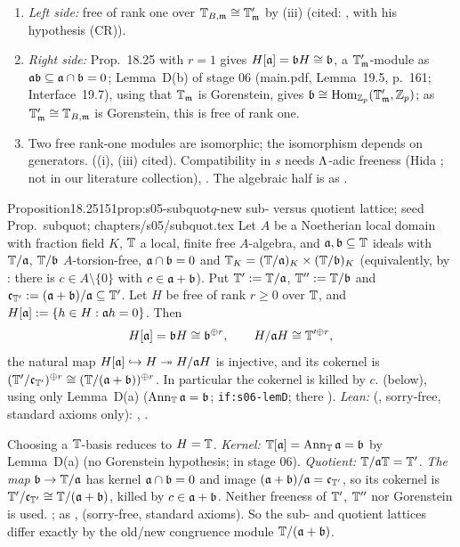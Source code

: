\begin{outline}
\begin{enumerate}[label=(\arabic*)]
\item \emph{Left side:} free of rank one over $\mathbb{T}_{B,\mathfrak{m}}\cong\mathbb{T}'_{\mathfrak{m}}$ by (iii) (cited: \cite[Thm.~4.5]{Hs}, with his hypothesis (CR)).
\item \emph{Right side:} Prop.~18.25 with $r=1$ gives $H[\mathfrak{a}]=\mathfrak{b} H\cong\mathfrak{b}$, a $\mathbb{T}'_{\mathfrak{m}}$-module as $\mathfrak{a}\mathfrak{b}\subseteq\mathfrak{a}\cap\mathfrak{b}=0$; Lemma~D(b) of stage 06
  (main.pdf, Lemma~19.5, p.~161; Interface~19.7), using that $\mathbb{T}_{\mathfrak{m}}$ is Gorenstein, gives $\mathfrak{b}\cong\operatorname{Hom}_{\mathbb{Z}_p}(\mathbb{T}'_{\mathfrak{m}},\mathbb{Z}_p)$; as $\mathbb{T}'_{\mathfrak{m}}\cong\mathbb{T}_{B,\mathfrak{m}}$ is
  Gorenstein, this is free of rank one.
\item Two free rank-one modules are isomorphic; the isomorphism depends on generators. \stpmc{} ((i), (iii) cited). Compatibility in
  $s$ needs $\Lambda$-adic freeness (Hida \cite{Hi86a}; not in our literature collection), \stsketch. The algebraic half is
  \stformal{} as .
\end{enumerate}
\end{outline}
\begin{quoted}{Proposition}{18.25}{151}{prop:s05-subquot}{$q$-new sub- versus quotient lattice; seed Prop.~subquot; }{chapters/s05/subquot.tex}\label{rpt:prop:s05-subquot}
Let $A$ be a Noetherian local domain with fraction field $K$, $\mathbb{T}$ a local, finite free $A$-algebra, and $\mathfrak{a},\mathfrak{b}\subseteq\mathbb{T}$ ideals with
$\mathbb{T}/\mathfrak{a}$, $\mathbb{T}/\mathfrak{b}$ $A$-torsion-free, $\mathfrak{a}\cap\mathfrak{b}=0$ and $\mathbb{T}_K=(\mathbb{T}/\mathfrak{a})_K\times(\mathbb{T}/\mathfrak{b})_K$ (equivalently, by :
there is $c\in A\setminus\{0\}$ with $c\in\mathfrak{a}+\mathfrak{b}$). Put $\mathbb{T}':=\mathbb{T}/\mathfrak{a}$, $\mathbb{T}'':=\mathbb{T}/\mathfrak{b}$ and $\mathfrak{c}_{\mathbb{T}'}:=(\mathfrak{a}+\mathfrak{b})/\mathfrak{a}\subseteq\mathbb{T}'$. Let $H$ be free
of rank $r\ge0$ over $\mathbb{T}$, and $H[\mathfrak{a}]:=\{h\in H:\mathfrak{a} h=0\}$. Then
\[H[\mathfrak{a}]=\mathfrak{b} H\cong\mathfrak{b}^{\oplus r},\qquad H/\mathfrak{a} H\cong\mathbb{T}'^{\oplus r},\]
the natural map $H[\mathfrak{a}]\hookrightarrow H\twoheadrightarrow H/\mathfrak{a} H$ is injective, and its cokernel is $(\mathbb{T}'/\mathfrak{c}_{\mathbb{T}'})^{\oplus r}\cong(\mathbb{T}/(\mathfrak{a}+\mathfrak{b}))^{\oplus r}$.
In particular the cokernel is killed by $c$. \stproved{} (below), using only Lemma~D(a) ($\operatorname{Ann}_{\mathbb{T}}\mathfrak{a}=\mathfrak{b}$; \texttt{if:s06-lemD}; there
\stproved).
\emph{Lean:} \stformal{} (, sorry-free, standard axioms only): , .
\end{quoted}
\begin{outline}
Choosing a $\mathbb{T}$-basis reduces to $H=\mathbb{T}$. \emph{Kernel:} $\mathbb{T}[\mathfrak{a}]=\operatorname{Ann}_{\mathbb{T}}\mathfrak{a}=\mathfrak{b}$ by Lemma~D(a) (no Gorenstein hypothesis; \stproved{} in
stage 06). \emph{Quotient:} $\mathbb{T}/\mathfrak{a}\mathbb{T}=\mathbb{T}'$. \emph{The map} $\mathfrak{b}\to\mathbb{T}/\mathfrak{a}$ has kernel $\mathfrak{a}\cap\mathfrak{b}=0$ and image $(\mathfrak{a}+\mathfrak{b})/\mathfrak{a}=\mathfrak{c}_{\mathbb{T}'}$, so its cokernel is
$\mathbb{T}'/\mathfrak{c}_{\mathbb{T}'}\cong\mathbb{T}/(\mathfrak{a}+\mathfrak{b})$, killed by $c\in\mathfrak{a}+\mathfrak{b}$. Neither freeness of $\mathbb{T}'$, $\mathbb{T}''$ nor Gorenstein is used. \stproved;
\stformal{} as ,  (sorry-free, standard axioms). So the
sub- and quotient lattices differ exactly by the old/new congruence module $\mathbb{T}/(\mathfrak{a}+\mathfrak{b})$.
\end{outline}

